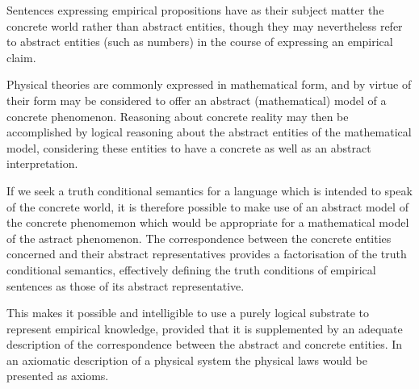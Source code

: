 \documentclass[10pt,titlepage]{book}
\newcommand{\ignore}[1]{}
\begin{document}
Sentences expressing empirical propositions have as their subject matter the concrete world rather than abstract entities, though they may nevertheless refer to abstract entities (such as numbers) in the course of expressing an empirical claim.

Physical theories are commonly expressed in mathematical form, and by virtue of their form may be considered to offer an abstract (mathematical) model of a concrete phenomenon.
Reasoning about concrete reality may then be accomplished by logical reasoning about the abstract entities of the mathematical model, considering these entities to have a concrete as well as an abstract interpretation.

If we seek a truth conditional semantics for a language which is intended to speak of the concrete world, it is therefore possible to make use of an abstract model of the concrete phenomemon which would be appropriate for a mathematical model of the astract phenomenon.
The correspondence between the concrete entities concerned and their abstract representatives provides a factorisation of the truth conditional semantics, effectively defining the truth conditions of empirical sentences as those of its abstract representative.

This makes it possible and intelligible to use a purely logical substrate to represent empirical knowledge, provided that it is supplemented by an adequate description of the correspondence between the abstract and concrete entities.
In an axiomatic description of a physical system the physical laws would be presented as axioms.

\ignore{
\begin{quote}
``Matters of fact, which are the second objects of human reason, are not ascertained in the same manner; nor is our evidence of their truth, however great, of a like nature with the foregoing. The contrary of every matter of fact is still possible; because it can never imply a contradiction, and is conceived by the mind with the same facility and distinctness, as if ever so conformable to reality. That the sun will not rise to-morrow is no less intelligible a proposition, and implies no more contradiction than the affirmation, that it will rise. We should in vain, therefore, attempt to demonstrate its falsehood. Were it demonstratively false, it would imply a contradiction, and could never be distinctly conceived by the mind.''
\end{quote}
}%
\end{document}
